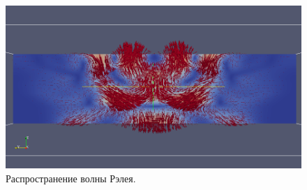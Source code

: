 \begin{figure}[htp]
\centering
\includegraphics[width=\textwidth]{png/v-0016.png}
\caption{Распространение волны Рэлея.}
\label{pic:multilayer_Rayleigh_2}
\end{figure}
